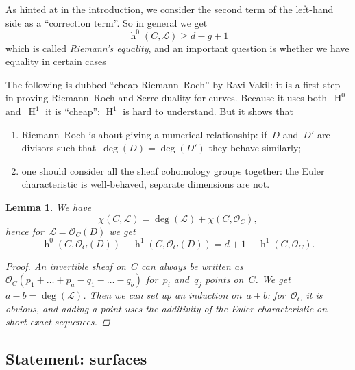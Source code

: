 \documentclass[10pt,a4paper]{article}
\theoremstyle{lecture}
\newtheorem{lemma}[theorem]{Lemma}
\DeclareMathOperator\hh{h}
\DeclareMathOperator\HH{H}
\begin{document}
As hinted at in the introduction, we consider the second term of the left-hand side as a ``correction term''. So in general we get
\begin{equation}
  \hh^0(C,\mathcal{L})\geq d-g+1
\end{equation}
which is called \emph{Riemann's equality}, and an important question is whether we have equality in certain cases

The following is dubbed ``cheap Riemann--Roch'' by Ravi Vakil: it is a first step in proving Riemann--Roch and Serre duality for curves. Because it uses both~$\HH^0$ and~$\HH^1$ it is ``cheap'': $\HH^1$ is hard to understand. But it shows that
\begin{enumerate}
  \item Riemann--Roch is about giving a numerical relationship: if~$D$ and~$D'$ are divisors such that~$\deg(D)=\deg(D')$ they behave similarly;
  \item one should consider all the sheaf cohomology groups together: the Euler characteristic is well-behaved, separate dimensions are not.
\end{enumerate}
\begin{lemma}
  \label{lemma:cheap-riemann-roch}
  We have
  \begin{equation}
    \chi(C,\mathcal{L})=\deg(\mathcal{L})+\chi(C,\mathcal{O}_C),
  \end{equation}
  hence for~$\mathcal{L}=\mathcal{O}_C(D)$ we get
  \begin{equation}
    \hh^0(C,\mathcal{O}_C(D))-\hh^1(C,\mathcal{O}_C(D))=d+1-\hh^1(C,\mathcal{O}_C).
  \end{equation}

  \begin{proof}
    An invertible sheaf on~$C$ can always be written as~$\mathcal{O}_C(p_1+\dotso+p_a-q_1-\dotso-q_b)$ for~$p_i$ and~$q_j$ points on~$C$. We get~$a-b=\deg(\mathcal{L})$. Then we can set up an induction on~$a+b$: for~$\mathcal{O}_C$ it is obvious, and adding a point uses the additivity of the Euler characteristic on short exact sequences.
  \end{proof}
\end{lemma}

\subsection{Statement: surfaces}
\label{subsection:statement-surfaces}
\end{document}
